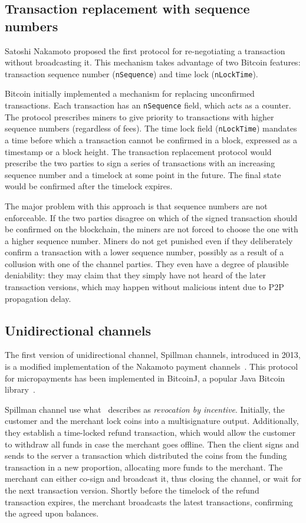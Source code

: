 \subsection{Transaction replacement with sequence numbers}

Satoshi Nakamoto proposed the first protocol for re-negotiating a transaction without broadcasting it.
This mechanism takes advantage of two Bitcoin features: transaction sequence number (\texttt{nSequence}) and time lock (\texttt{nLockTime}).

Bitcoin initially implemented a mechanism for replacing unconfirmed transactions.
Each transaction has an \texttt{nSequence} field, which acts as a counter.
The protocol prescribes miners to give priority to transactions with higher sequence numbers (regardless of fees).
The time lock field (\texttt{nLockTime}) mandates a time before which a transaction cannot be confirmed in a block, expressed as a timestamp or a block height.
The transaction replacement protocol would prescribe the two parties to sign a series of transactions with an increasing sequence number and a timelock at some point in the future.
The final state would be confirmed after the timelock expires.

The major problem with this approach is that sequence numbers are not enforceable.
If the two parties disagree on which of the signed transaction should be confirmed on the blockchain, the miners are not forced to choose the one with a higher sequence number.
Miners do not get punished even if they deliberately confirm a transaction with a lower sequence number, possibly as a result of a collusion with one of the channel parties.
They even have a degree of plausible deniability: they may claim that they simply have not heard of the later transaction versions, which may happen without malicious intent due to P2P propagation delay.


\subsection{Unidirectional channels}

The first version of unidirectional channel, Spillman channels, introduced in 2013, is a modified implementation of the Nakamoto payment channels~\cite{Spillman2013}.
This protocol for micropayments has been implemented in BitcoinJ, a popular Java Bitcoin library~\cite{BitcoinJ}.

Spillman channel use what~\cite{Gudgeon2019} describes as \textit{revocation by incentive}.
Initially, the customer and the merchant lock coins into a multisignature output.
Additionally, they establish a time-locked refund transaction, which would allow the customer to withdraw all funds in case the merchant goes offline.
Then the client signs and sends to the server a transaction which distributed the coins from the funding transaction in a new proportion, allocating more funds to the merchant.
The merchant can either co-sign and broadcast it, thus closing the channel, or wait for the next transaction version.
Shortly before the timelock of the refund transaction expires, the merchant broadcasts the latest transactions, confirming the agreed upon balances.

